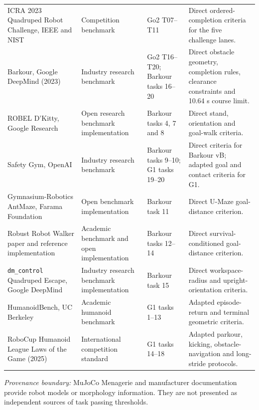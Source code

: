 \begin{landscape}
\begin{longtable}{@{}>{\raggedright\arraybackslash}p{50mm}>{\raggedright\arraybackslash}p{34mm}>{\raggedright\arraybackslash}p{39mm}>{\raggedright\arraybackslash}p{85mm}@{}}
ICRA 2023 Quadruped Robot Challenge, IEEE and NIST & Competition benchmark & Go2 T07--T11 & Direct ordered-completion criteria for the five challenge lanes. \\
Barkour, Google DeepMind (2023) & Industry research benchmark & Go2 T16--T20; Barkour tasks 16--20 & Direct obstacle geometry, completion rules, clearance constraints and 10.64 s course limit. \\
ROBEL D'Kitty, Google Research & Open research benchmark implementation & Barkour tasks 4, 7 and 8 & Direct stand, orientation and goal-walk criteria. \\
Safety Gym, OpenAI & Industry research benchmark & Barkour tasks 9--10; G1 tasks 19--20 & Direct criteria for Barkour vB; adapted goal and contact criteria for G1. \\
Gymnasium-Robotics AntMaze, Farama Foundation & Open benchmark implementation & Barkour task 11 & Direct U-Maze goal-distance criterion. \\
Robust Robot Walker paper and reference implementation & Academic benchmark and open implementation & Barkour tasks 12--14 & Direct survival-conditioned goal-distance criterion. \\
\texttt{dm\_control} Quadruped Escape, Google DeepMind & Industry research benchmark implementation & Barkour task 15 & Direct workspace-radius and upright-orientation criteria. \\
HumanoidBench, UC Berkeley & Academic humanoid benchmark & G1 tasks 1--13 & Adapted episode-return and terminal geometric criteria. \\
RoboCup Humanoid League Laws of the Game (2025) & International competition standard & G1 tasks 14--18 & Adapted parkour, kicking, obstacle-navigation and long-stride protocols. \\
\end{longtable}

\noindent\emph{Provenance boundary:} MuJoCo Menagerie and manufacturer documentation provide robot models or morphology information. They are not presented as independent sources of task passing thresholds.
\endgroup
\end{landscape}
